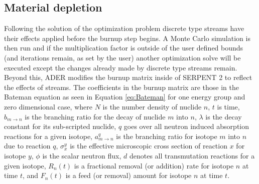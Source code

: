 
\subsection{Material depletion} \label{ssec:burn}
Following the solution of the optimization problem discrete type streams have
their effects applied before the burnup step begins. A Monte Carlo simulation is
then run and if the multiplication factor is outside of the user defined bounds
(and iterations remain, as set by the user) another optimization solve will be
executed except the changes already made by discrete type streams remain. 
Beyond this, ADER modifies the burnup matrix inside of
SERPENT 2 to reflect the effects of streams. The coefficients in the burnup
matrix are those in the Bateman equation as seen in Equation \ref{eq:Bateman} 
for one energy group and zero dimensional case, 
where $N$ is the number density of nuclide $n$, $t$ is time, $b_{m \to n}$ is 
the branching ratio for the decay of nuclide $m$ into $n$, $\lambda$ is the 
decay constant for its sub-scripted nuclide,
$q$ goes over all neutron induced absorption reactions for a given isotope, 
$a_{m \to n}^{q}$ is the branching ratio for isotope $m$ into $n$ due to
reaction $q$, $\sigma_{x}^{y}$ is the effective microscopic
cross section of reaction $x$ for isotope $y$, $\phi$ is the
scalar neutron flux, $d$ denotes all
transmutation reactions for a given isotope, $R_{n}(t)$ is a
fractional removal (or addition) rate for isotope $n$ at
time $t$, and $F_{n}(t)$ is a feed (or removal) amount for isotope
$n$ at time $t$. 

